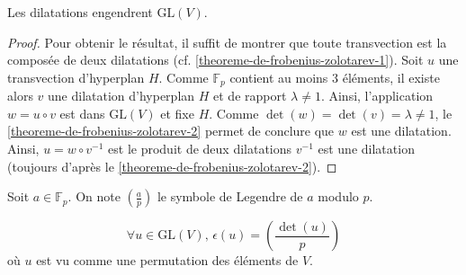 
	\begin{lemma}
		\label{theoreme-de-frobenius-zolotarev-3}
		Les dilatations engendrent $\mathrm{GL}(V)$.
	\end{lemma}

	\begin{proof}
		Pour obtenir le résultat, il suffit de montrer que toute transvection est la composée de deux dilatations (cf. \cref{theoreme-de-frobenius-zolotarev-1}). Soit $u$ une transvection d'hyperplan $H$. Comme $\mathbb{F}_p$ contient au moins $3$ éléments, il existe alors $v$ une dilatation d'hyperplan $H$ et de rapport $\lambda \neq 1$.
		\newpar
		Ainsi, l'application $w = u \circ v$ est dans $\mathrm{GL}(V)$ et fixe $H$. Comme $\det(w) = \det(v) = \lambda \neq 1$, le \cref{theoreme-de-frobenius-zolotarev-2} permet de conclure que $w$ est une dilatation. Ainsi, $u = w \circ v^{-1}$ est le produit de deux dilatations $v^{-1}$ est une dilatation (toujours d'après le \cref{theoreme-de-frobenius-zolotarev-2}).
	\end{proof}

	\begin{notation}
		Soit $a \in \mathbb{F}_p$. On note $\left( \frac{a}{p} \right)$ le symbole de Legendre de $a$ modulo $p$.
	\end{notation}

	\begin{theorem}
		\[ \forall u \in \mathrm{GL}(V), \, \epsilon(u) = \left( \frac{\det(u)}{p} \right) \]
		où $u$ est vu comme une permutation des éléments de $V$.
	\end{theorem}

